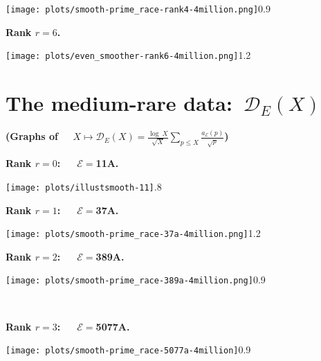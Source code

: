 \documentclass[11pt]{article}
\theoremstyle{plain}
\theoremstyle{definition}
\numberwithin{equation}{section}
\numberwithin{figure}{section}
\numberwithin{table}{section}
\begin{document}
     \texttt{[image: plots/smooth-prime\_race-rank4-4million.png]}{0.9}~\label{sr4}

 \vskip40pt






 \newpage

  \centerline{\bf Rank $r=6$.}


 \vskip20pt



     \texttt{[image: plots/even\_smoother-rank6-4million.png]}{1.2}~\label{sr6}
         \section{The medium-rare data:\   ${\mathcal D}_E(X)$}
       \vskip40pt

       \centerline{\bf (Graphs of \ \   $X\mapsto {\mathcal D}_E(X) = {\frac{\log\ X}{\sqrt X}}\sum_{p \le X}{\frac{a_{\mathcal E}(p)}{\sqrt p}}$)}

 \vskip40pt


  \centerline{\bf Rank $r=0$:\ \ \  ${\mathcal E}=$11A.}
   \vskip20pt
   \texttt{[image: plots/illustsmooth-11]}{.8}~\label{s11}
  \

    \newpage

  \centerline{\bf Rank $r=1$:\ \ \  ${\mathcal E}=$37A.}


   \vskip40pt



     \texttt{[image: plots/smooth-prime\_race-37a-4million.png]}{1.2}~\label{s37}
%

   \vskip40pt


  \centerline{\bf Rank $r=2$:\ \ \  ${\mathcal E}=$389A.}


  \vskip20pt


     \texttt{[image: plots/smooth-prime\_race-389a-4million.png]}{0.9}~\label{s389}


\newpage

\
  \centerline{\bf Rank $r=3$:\ \ \  ${\mathcal E}=$5077A.}


 \vskip10pt



     \texttt{[image: plots/smooth-prime\_race-5077a-4million]}{0.9}~\label{s5077}
\end{document}
